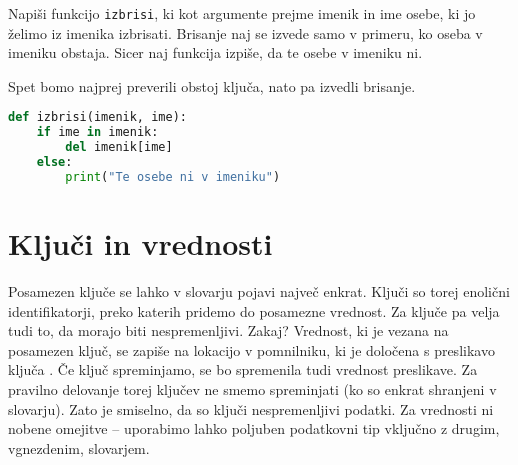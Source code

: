 \begin{zgled}
Napiši funkcijo \texttt{izbrisi}, ki kot argumente prejme imenik in ime osebe, ki jo želimo iz imenika izbrisati. Brisanje naj se izvede samo v primeru, ko oseba v imeniku obstaja. Sicer naj funkcija izpiše, da te osebe v imeniku ni.
\end{zgled}
\begin{resitev}
Spet bomo najprej preverili obstoj ključa, nato pa izvedli brisanje.
\begin{lstlisting}[language=Python, showstringspaces=false]
def izbrisi(imenik, ime):
    if ime in imenik:
        del imenik[ime]
    else:
        print("Te osebe ni v imeniku")
\end{lstlisting}
\end{resitev}

\section{Ključi in vrednosti}

Posamezen ključe se lahko v slovarju pojavi največ enkrat. Ključi so torej enolični identifikatorji, preko katerih pridemo do posamezne vrednost. Za ključe pa velja tudi to, da morajo biti nespremenljivi. Zakaj? Vrednost, ki je vezana na posamezen ključ, se zapiše na lokacijo v pomnilniku, ki je določena s preslikavo ključa . Če ključ spreminjamo, se bo spremenila tudi vrednost preslikave. Za pravilno delovanje torej ključev ne smemo spreminjati (ko so enkrat shranjeni v slovarju). Zato je smiselno, da so ključi nespremenljivi podatki. Za vrednosti ni nobene omejitve -- uporabimo lahko poljuben podatkovni tip vključno z drugim, vgnezdenim, slovarjem.

